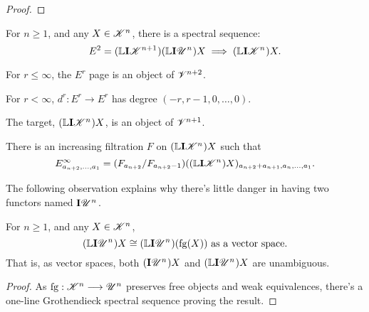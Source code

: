 \documentclass[11pt]{article}
\newcommand{\GS}[1]{\scrE^{#1}}
\newcommand{\PRLie}[1]{\scrR^{#1}}%
\newcommand{\LL}[1]{{\scrK}^{#1}}%
\newcommand{\GR}[1]{\scrV^{#1}}%
\newcommand{\nontop}[1]{\scrU^{#1}}%
\newcommand{\PiAlg}[1]{#1\textup{-$\Pi$-alg}}
\newcommand{\Ind}[2][]{\mathbf{I}{#2}_{#1}}%
\newcommand{\forget}{\mathrm{fg}}
\newcommand{\Fr}[1]{#1}%
\newcommand{\derived}{\mathbb{L}}
\begin{document}
\begin{GrothendieckSpectralSequences}
\begin{proof}
\end{proof}
\begin{cor*}
For $n\geq1$, and any $X\in\LL{n}$, there is a spectral sequence:
\[E^2=(\derived{\Ind{\LL{n+1}}})(\derived\Ind{\nontop{n}})X\implies(\derived\Ind{\LL{n}})X.\]
\begin{itemise}
\setlength{\parindent}{.25in}
\item For $r\leq\infty$, the $E^r$ page is an object of $\GR{n+2}$.
\item For $r<\infty$, $d^r:E^r\to E^r$ has degree $(-r,r-1,0,\ldots,0)$.
\item The target, $(\derived\Ind{\LL{n}})X$, is an object of $\GR{n+1}$.
\item There is an increasing filtration $F$ on $(\derived\Ind{\LL{n}})X$ such that
\[E^\infty_{a_{n+2},\ldots,a_1}=(F_{a_{n+2}}/F_{a_{n+2}-1})((\derived\Ind{\LL{n}})X)_{a_{n+2}+a_{n+1},a_n,\ldots,a_1}.\]
\end{itemise}
\end{cor*}
The following observation explains why there's little danger in having two functors named $\Ind{\nontop{n}}$.
\begin{lem*}
For $n\geq1$, and any $X\in\LL{n}$,
\[(\derived{\Ind{\nontop{n}}})X\cong(\derived{\Ind{\nontop{n}}})(\forget(X))\textup{ as a vector space.}\]
That is, as vector spaces, both $(\Ind{\nontop{n}})X$ and $(\derived{\Ind{\nontop{n}}})X$ are unambiguous.
\end{lem*}
\begin{proof}
As $\forget:\LL{n}\to\nontop{n}$ preserves free objects and weak equivalences, there's a one-line Grothendieck spectral sequence proving the result.
\end{proof}
\end{GrothendieckSpectralSequences}
\end{document}
